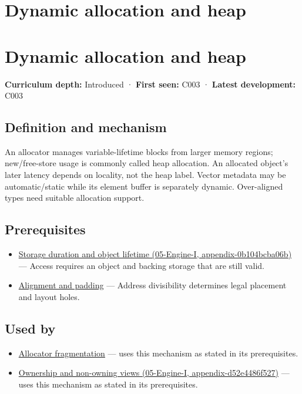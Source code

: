 \hypertarget{appendix-c3480f7d9ff3}{}
\section*{Dynamic allocation and heap}
\section{Dynamic allocation and heap}\label{appendix-c3480f7d9ff3-dynamic-allocation-and-heap}

\textbf{Curriculum depth:} Introduced · \textbf{First seen:} C003 · \textbf{Latest development:} C003

\subsection{Definition and mechanism}\label{appendix-c3480f7d9ff3-definition-and-mechanism}

An allocator manages variable-lifetime blocks from larger memory regions; new/free-store usage is commonly called heap allocation. An allocated object's later latency depends on locality, not the heap label. Vector metadata may be automatic/static while its element buffer is separately dynamic. Over-aligned types need suitable allocation support.

\subsection{Prerequisites}\label{appendix-c3480f7d9ff3-prerequisites}

\begin{itemize}
\tightlist
\item
  \href{../05-Engine-I/main.pdf\#nameddest=appendix-0b104bcba06b}{Storage duration and object lifetime (05-Engine-I, appendix-0b104bcba06b)} --- Access requires an object and backing storage that are still valid.
\item
  \hyperref[appendix-a1f7c53b4742]{Alignment and padding} --- Address divisibility determines legal placement and layout holes.
\end{itemize}

\subsection{Used by}\label{appendix-c3480f7d9ff3-used-by}

\begin{itemize}
\tightlist
\item
  \hyperref[appendix-a7c50686d81f]{Allocator fragmentation} --- uses this mechanism as stated in its prerequisites.
\item
  \href{../05-Engine-I/main.pdf\#nameddest=appendix-d52e4486f527}{Ownership and non-owning views (05-Engine-I, appendix-d52e4486f527)} --- uses this mechanism as stated in its prerequisites.
\end{itemize}

